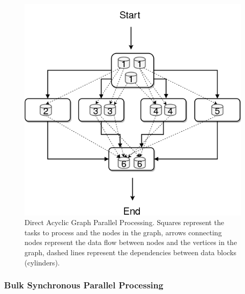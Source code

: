 \documentclass[3p,review]{elsarticle}
\begin{document}
\begin{figure}[htp]
    \centering
    \includegraphics[height=0.4\textheight]{dag}
    \caption{Direct Acyclic Graph Parallel Processing. Squares represent the tasks to process and the nodes in the graph, arrows connecting nodes represent the data flow between nodes and the vertices in the graph, dashed lines represent the dependencies between data blocks (cylinders).}
    \label{fig:dag}
\end{figure}


\subsubsection{Bulk Synchronous Parallel Processing}
\end{document}
